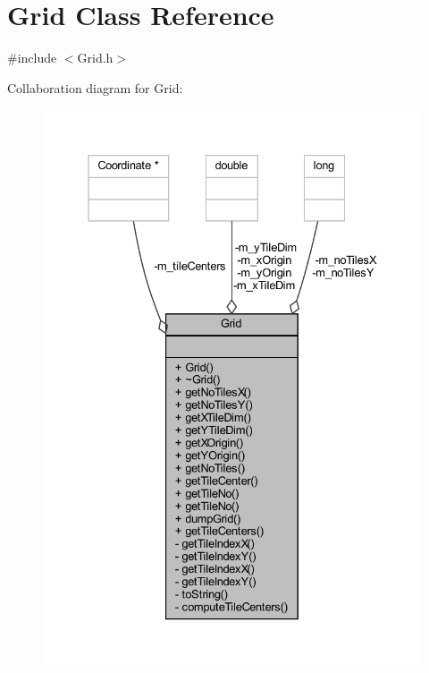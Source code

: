 \hypertarget{class_grid}{}\section{Grid Class Reference}
\label{class_grid}


{\ttfamily \#include $<$Grid.\+h$>$}



Collaboration diagram for Grid\+:\nopagebreak
\begin{figure}[H]
\begin{center}
\leavevmode
\includegraphics[width=331pt]{class_grid__coll__graph}
\end{center}
\end{figure}
